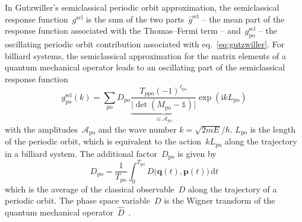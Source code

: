 \documentclass[doublecol]{epl2}
\newcommand{\ii}{\mathrm{i}}
\renewcommand{\vec}[1]{\boldsymbol{#1}}
\begin{document}
In Gutzwiller's semiclassical periodic orbit approximation, the semiclassical response function~$g^\mathrm{scl}$ is the sum of the two parts~$\bar{g}^\mathrm{scl}$ -- the mean part of the response function associated with the Thomas--Fermi term -- and~$g^\mathrm{scl}_\mathrm{po}$ -- the oscillating periodic orbit contribution associated with eq.~\eqref{eq:gutzwiller}. For billiard systems, the semiclassical approximation for the matrix elements of a quantum mechanical operator leads to an oscillating part of the semiclassical response function
\begin{equation}
  g^\mathrm{scl}_\mathrm{po}(k) = \sum_\mathrm{po} D_\mathrm{po} \underbrace{\frac{T_\mathrm{ppo}(-1)^{\ell_\mathrm{po}}}{\bigl\lvert \det (M_\mathrm{po} - \mathbb{1})\bigr\rvert}}_{\equiv \mathcal{A}_\mathrm{po}} \exp(\ii k L_\mathrm{po})
  \label{eq:scl_billiard_response}
\end{equation}
with the amplitudes~$\mathcal{A}_\mathrm{po}$ and the wave number $k = \sqrt{2mE}/\hbar$. $L_\mathrm{po}$ is the length of the periodic orbit, which is equivalent to the action~$k L_\mathrm{po}$ along the trajectory in a billiard system. The additional factor~$D_\mathrm{po}$ is given by
\begin{equation}
  D_\mathrm{po} = \frac{1}{T_\mathrm{po}} \int_0^{T_\mathrm{po}} D\bigl(\vec{q}(t), \vec{p}(t)\bigr)\,\mathrm{d}t
  \label{eq:mean_value}
\end{equation}
which is the average of the classical observable~$D$ along the trajectory of a periodic orbit. The phase space variable~$D$ is the Wigner transform of the quantum mechanical operator~$\hat{D}$~\cite{eckhardt_semiclassical_1992}.
\end{document}
